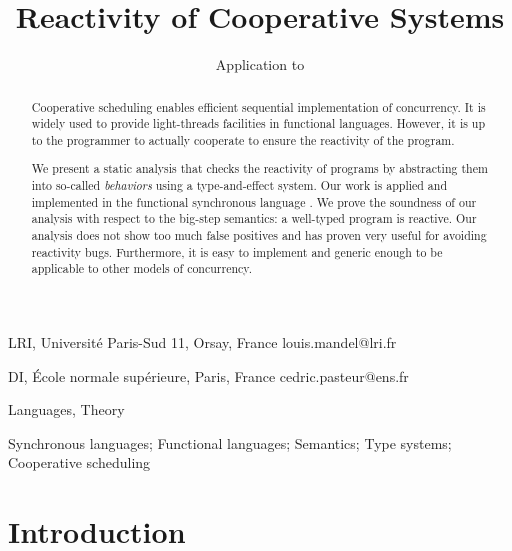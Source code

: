 \documentclass[9pt]{sigplanconf}
\begin{document}
\newtheorem{theorem}{Theorem}
\newtheorem{property}[theorem]{Property}
\newtheorem{lemma}[theorem]{Lemma}
\newtheorem{hypothesis}[theorem]{Hypothesis}

\theoremstyle{definition}
\newtheorem{definition}{Definition}

\title{Reactivity of Cooperative Systems}
\subtitle{Application to \rml}

{LRI, Universit\'e Paris-Sud 11, Orsay, France}
{louis.mandel@lri.fr}

{DI, \'Ecole normale sup\'erieure, Paris, France}
{cedric.pasteur@ens.fr}

\maketitle

\begin{abstract}
Cooperative scheduling enables efficient sequential implementation of concurrency. It is widely used to provide light-threads facilities in functional languages. However, it is up to the programmer to actually cooperate to ensure the reactivity of the program. 

We present a static analysis that checks the reactivity of programs by abstracting them into so-called \emph{behaviors} using a type-and-effect system. Our work is applied and implemented in the functional synchronous language \rml. We prove the soundness of our analysis with respect to the big-step semantics: a well-typed program is reactive. Our analysis does not show too much false positives and has proven very useful for avoiding reactivity bugs. Furthermore, it is easy to implement and generic enough to be applicable to other models of concurrency.
\end{abstract}


\terms
Languages, Theory

\keywords
Synchronous languages; Functional languages;  Semantics; Type systems; Cooperative scheduling

\section{Introduction}
\label{sec:introduction}
\end{document}
